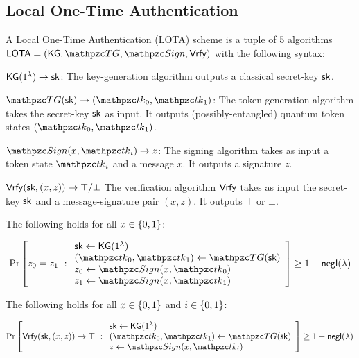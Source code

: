 \begin{comment}
\begin{remark}
We will also consider a weaker notion $\expc{\DOTP,\qA}{d}{ots}{weak}$
where $R_0, R_1$ are sent back to $\qA_0, \qA_1$ who then send $R_0',
R_1'$. In other words, collusion is never allowed in this variant, so
$\qA_2$ is not part of the experiment.
\end{remark}
\end{comment}

\subsection{Local One-Time Authentication}

A Local One-Time Authentication (LOTA) scheme is a tuple of 5
algorithms $\LOTA = (\KG, \TG, \qSign, \Vrfy)$ with the
following syntax:

\begin{description}
\item $\mathsf{KG}(1^\lambda) \rightarrow \mathsf{sk}$: The key-generation algorithm outputs a
classical secret-key $\mathsf{sk}$.
\item $\TG(\sk) \ra (\qtk_0, \qtk_1)$: The token-generation algorithm
takes the secret-key $\mathsf{sk}$ as input. It outputs (possibly-entangled)
quantum token states $(\qtk_0, \qtk_1)$.
\item $\qSign(x, \qtk_i) \ra z$: The signing algorithm takes as
input a token state $\qtk_i$ and a message $x$. It outputs a signature $z$.
\item $\mathsf{Vrfy}(\mathsf{sk}, (x, z)) \rightarrow \top/\bot$ The verification algorithm
$\mathsf{Vrfy}$ takes as input the secret-key $\mathsf{sk}$ and a message-signature
pair $(x, z)$. It outputs $\top$ or $\bot$.

\item[Same Signatures:] The following holds for all $x \in \{0,1\}$:

\begin{align}
\Pr\left[
z_0 = z_1
\ :
\begin{array}{ll}
\sk \gets \KG(1^\secp)\\
(\qtk_0, \qtk_1) \gets \TG(\sk)\\
z_0 \leftarrow \qSign(x, \qtk_0)\\
z_1 \leftarrow \qSign(x, \qtk_1)
\end{array}
\right] \geq 1 - \negl(\secp)
\end{align}

\item[Verification Correctness:] The following holds for all
$x\in\{0,1\}$ and $i \in \{0,1\}$:

\begin{align}
\Pr\left[
\Vrfy(\sk, (x,z)) \ra \top
\ :
\begin{array}{ll}
\sk \gets \KG(1^\secp)\\
(\qtk_0, \qtk_1) \gets \TG(\sk)\\
z \leftarrow \qSign(x, \qtk_i)
\end{array}
\right] \geq 1 - \negl(\secp)
\end{align}


\end{description}

